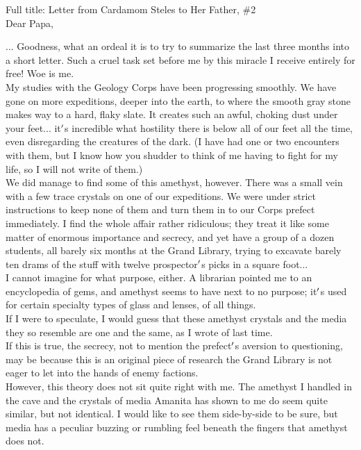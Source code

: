 \documentclass[12pt]{article}
\begin{document}
  
    Full title: Letter from Cardamom Steles to Her Father, \#2\\Dear Papa,

... Goodness, what an ordeal it is to try to summarize the last three months into a short letter. Such a cruel task set before me by this miracle I receive entirely for free! Woe is me.\\


  
    My studies with the Geology Corps have been progressing smoothly. We have gone on more expeditions, deeper into the earth, to where the smooth gray stone makes way to a hard, flaky slate. It creates such an awful, choking dust under your feet... it$\rq$s incredible what hostility there is below all of our feet all the time, even disregarding the creatures of the dark. (I have had one or two encounters with them, but I know how you shudder to think of me having to fight for my life, so I will not write of them.)\\


  
    We did manage to find some of this amethyst, however. There was a small vein with a few trace crystals on one of our expeditions. We were under strict instructions to keep none of them and turn them in to our Corps prefect immediately. I find the whole affair rather ridiculous; they treat it like some matter of enormous importance and secrecy, and yet have a group of a dozen students, all barely six months at the Grand Library, trying to excavate barely ten drams of the stuff with twelve prospector$\rq$s picks in a square foot...\\


  
    I cannot imagine for what purpose, either. A librarian pointed me to an encyclopedia of gems, and amethyst seems to have next to no purpose; it$\rq$s used for certain specialty types of glass and lenses, of all things.\\If I were to speculate, I would guess that these amethyst crystals and the media they so resemble are one and the same, as I wrote of last time.\\


  
    If this is true, the secrecy, not to mention the prefect$\rq$s aversion to questioning, may be because this is an original piece of research the Grand Library is not eager to let into the hands of enemy factions.\\However, this theory does not sit quite right with me. The amethyst I handled in the cave and the crystals of media Amanita has shown to me do seem quite similar, but not identical. I would like to see them side-by-side to be sure, but media has a peculiar buzzing or rumbling feel beneath the fingers that amethyst does not.\\
\end{document}
